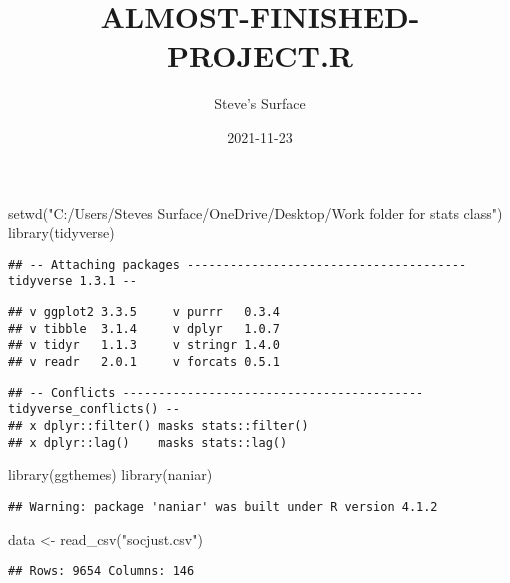 \documentclass[
]{article}
\title{ALMOST-FINISHED-PROJECT.R}
\author{Steve's Surface}
\date{2021-11-23}
\newenvironment{Shaded}{\begin{snugshade}}{\end{snugshade}}
\newcommand{\FunctionTok}[1]{\textcolor[rgb]{0.00,0.00,0.00}{#1}}
\newcommand{\NormalTok}[1]{#1}
\newcommand{\OtherTok}[1]{\textcolor[rgb]{0.56,0.35,0.01}{#1}}
\newcommand{\StringTok}[1]{\textcolor[rgb]{0.31,0.60,0.02}{#1}}
\begin{document}
\maketitle

\begin{Shaded}
\begin{Highlighting}[]
\FunctionTok{setwd}\NormalTok{(}\StringTok{"C:/Users/Steve\textquotesingle{}s Surface/OneDrive/Desktop/Work folder for stats class"}\NormalTok{)}
\FunctionTok{library}\NormalTok{(tidyverse)}
\end{Highlighting}
\end{Shaded}

\begin{verbatim}
## -- Attaching packages --------------------------------------- tidyverse 1.3.1 --
\end{verbatim}

\begin{verbatim}
## v ggplot2 3.3.5     v purrr   0.3.4
## v tibble  3.1.4     v dplyr   1.0.7
## v tidyr   1.1.3     v stringr 1.4.0
## v readr   2.0.1     v forcats 0.5.1
\end{verbatim}

\begin{verbatim}
## -- Conflicts ------------------------------------------ tidyverse_conflicts() --
## x dplyr::filter() masks stats::filter()
## x dplyr::lag()    masks stats::lag()
\end{verbatim}

\begin{Shaded}
\begin{Highlighting}[]
\FunctionTok{library}\NormalTok{(ggthemes)}
\FunctionTok{library}\NormalTok{(naniar)}
\end{Highlighting}
\end{Shaded}

\begin{verbatim}
## Warning: package 'naniar' was built under R version 4.1.2
\end{verbatim}

\begin{Shaded}
\begin{Highlighting}[]
\NormalTok{data }\OtherTok{\textless{}{-}} \FunctionTok{read\_csv}\NormalTok{(}\StringTok{"socjust.csv"}\NormalTok{)}
\end{Highlighting}
\end{Shaded}

\begin{verbatim}
## Rows: 9654 Columns: 146
\end{verbatim}
\end{document}
